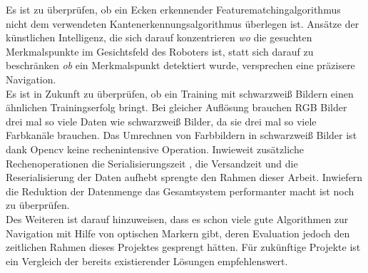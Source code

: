 \documentclass[conference]{IEEEtran}
\begin{document}
	Es ist zu überprüfen, ob ein Ecken erkennender Featurematchingalgorithmus nicht dem verwendeten Kantenerkennungsalgorithmus überlegen ist. Ansätze der künstlichen Intelligenz, die sich darauf konzentrieren \textit{wo} die gesuchten Merkmalspunkte  im Gesichtsfeld des Roboters ist, statt sich darauf zu beschränken \textit{ob} ein Merkmalspunkt detektiert wurde, versprechen eine präzisere Navigation. \\
	Es ist in Zukunft zu überprüfen, ob ein Training mit schwarzweiß Bildern einen ähnlichen Trainingserfolg bringt. Bei gleicher Auflösung brauchen RGB Bilder drei mal so viele Daten wie schwarzweiß Bilder, da sie drei mal so viele Farbkanäle brauchen. Das Umrechnen von Farbbildern in schwarzweiß Bilder ist dank Opencv keine rechenintensive Operation. Inwieweit zusätzliche Rechenoperationen die Serialisierungszeit , die Versandzeit und die Reserialisierung der Daten aufhebt sprengte den Rahmen dieser Arbeit. Inwiefern die Reduktion der Datenmenge das Gesamtsystem performanter macht ist noch zu überprüfen.
	\\
	Des Weiteren ist darauf hinzuweisen, dass es schon viele gute Algorithmen zur Navigation mit Hilfe von optischen Markern gibt, deren Evaluation jedoch den zeitlichen Rahmen dieses Projektes gesprengt hätten. Für zukünftige Projekte ist ein Vergleich der bereits existierender Lösungen empfehlenswert.
		
\end{document}
